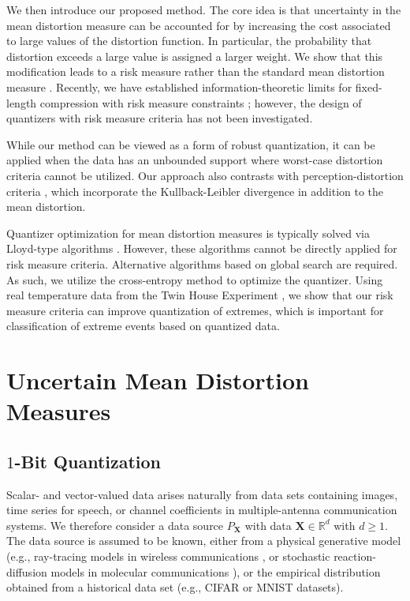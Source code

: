 \documentclass[conference]{IEEEtran}
\begin{document}
We then introduce our proposed method. The core idea is that uncertainty in the mean distortion measure can be accounted for by increasing the cost associated to large values of the distortion function. In particular, the probability that distortion exceeds a large value is assigned a larger weight. We show that this modification leads to a risk measure rather than the standard mean distortion measure \cite{Yaari1987dual,Serada2010distortion}. Recently, we have established information-theoretic limits for fixed-length compression with risk measure constraints \cite{Egan2025risk}; however, the design of quantizers with risk measure criteria has not been investigated. 

While our method can be viewed as a form of robust quantization, it can be applied when the data has an unbounded support where worst-case distortion criteria \cite{Gersho2012vector} cannot be utilized. Our approach also contrasts with perception-distortion criteria \cite{Blau2019rethinking}, which incorporate the Kullback-Leibler divergence in addition to the mean distortion. %

Quantizer optimization for mean distortion measures is typically solved via Lloyd-type algorithms \cite{Gersho2012vector}. However, these algorithms cannot be directly applied for risk measure criteria. Alternative algorithms based on global search are required. As such, we utilize the cross-entropy method \cite{Botev2013cross} to optimize the quantizer. Using real temperature data from the Twin House Experiment \cite{Kersken2020}, we show that our risk measure criteria can improve quantization of extremes, which is important for classification of extreme events based on quantized data.  

\section{Uncertain Mean Distortion Measures}

\subsection{$1$-Bit Quantization}

Scalar- and vector-valued data arises naturally from data sets containing images, time series for speech, or channel coefficients in multiple-antenna communication systems. We therefore consider a data source $P_{\mathbf{X}}$ with data $\mathbf{X} \in \mathbb{R}^d$ with $d \geq 1$. The data source is assumed to be known, either from a physical generative model (e.g., ray-tracing models in wireless communications \cite{Hoydis2023sionna}, or stochastic reaction-diffusion models in molecular communications \cite{Egan2022stochastic}), or the empirical distribution obtained from a historical data set (e.g., CIFAR or MNIST datasets). 
\end{document}
